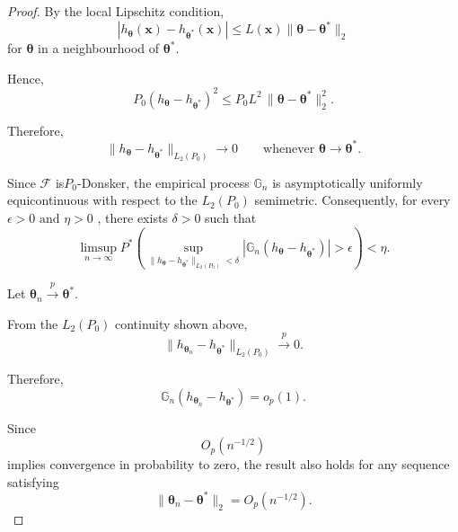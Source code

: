 \documentclass[pdflatex,sn-mathphys-ay]{sn-jnl}%
\let\oldtheta\theta
\renewcommand{\theta}{\boldsymbol{\oldtheta}}
\theoremstyle{thmstyleone}%
\theoremstyle{thmstyletwo}%
\theoremstyle{thmstylethree}%
\begin{document}
\begin{proof}

By the local Lipschitz condition,
\[
    |h_{\boldsymbol{\theta}}(\mathbf{x})
    -
    h_{\boldsymbol{\theta}^*}(\mathbf{x})|
    \leq
    L(\mathbf{x})
    \|
        \boldsymbol{\theta}
        -
        \boldsymbol{\theta}^*
    \|_2
\]
for $ \boldsymbol{\theta}$ in a neighbourhood of $\boldsymbol{\theta}^*$.

Hence,
\[
    P_0
    \left(
        h_{\boldsymbol{\theta}}
        -
        h_{\boldsymbol{\theta}^*}
    \right)^2
    \leq
    P_0L^2
    \,
    \|
        \boldsymbol{\theta}
        -
        \boldsymbol{\theta}^*
    \|_2^2.
\]

Therefore,
\[
    \|
        h_{\boldsymbol{\theta}}
        -
        h_{\boldsymbol{\theta}^*}
    \|_{L_2(P_0)}
    \to
    0
    \qquad
    \text{whenever }
    \boldsymbol{\theta}
    \to
    \boldsymbol{\theta}^*.
\]

Since $\mathcal{F}$ is$ P_0$-Donsker, the empirical process $\mathbb{G}_n$ is asymptotically uniformly equicontinuous with respect to the $ L_2(P_0)$ semimetric. Consequently, for every $  \epsilon>0
    \text{ and } \eta>0$ , there exists $ \delta>0$ such that
\[
    \limsup_{n\to\infty}
    P^*
    \left(
        \sup_{
            \|
                h_{\boldsymbol{\theta}}
                -
                h_{\boldsymbol{\theta}^*}
            \|_{L_2(P_0)}
            <
            \delta
        }
        \left|
            \mathbb{G}_n
            \left(
                h_{\boldsymbol{\theta}}
                -
                h_{\boldsymbol{\theta}^*}
            \right)
        \right|
        >
        \epsilon
    \right)
    <
    \eta.
\]

Let $\boldsymbol{\theta}_n
    \xrightarrow{p}
    \boldsymbol{\theta}^*$.

From the $L_2(P_0)$ continuity shown above,
\[
    \|
        h_{\boldsymbol{\theta}_n}
        -
        h_{\boldsymbol{\theta}^*}
    \|_{L_2(P_0)}
    \xrightarrow{p}
    0.
\]

Therefore,
\[
    \mathbb{G}_n
    \left(
        h_{\boldsymbol{\theta}_n}
        -
        h_{\boldsymbol{\theta}^*}
    \right)
    =
    o_p(1).
\]

Since
\[
    O_p(n^{-1/2})
\]
implies convergence in probability to zero, the result also holds for any sequence satisfying
\[
    \|
        \boldsymbol{\theta}_n
        -
        \boldsymbol{\theta}^*
    \|_2
    =
    O_p(n^{-1/2}).
\]

\end{proof}
\end{document}
